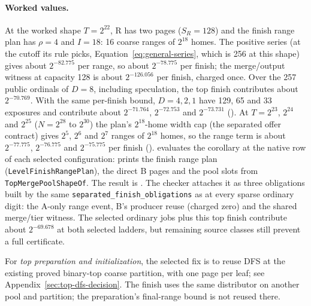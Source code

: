 \documentclass[11pt]{article}
\theoremstyle{definition}
\theoremstyle{remark}
\begin{document}
\paragraph{Worked values.}
At the worked shape $T=2^{22}$, R has two pages ($S_R=128$) and the finish
range plan has $\rho=4$ and $I=18$: 16 coarse ranges of $2^{18}$ homes.
The positive series (at the cutoff its rule picks,
Equation~\eqref{eq:general-series}, which is 256 at this shape) gives about
$2^{-82.775}$ per range, so about $2^{-78.775}$ per finish; the merge/output witness at capacity 128 is
about $2^{-126.056}$ per finish, charged once. Over the 257 public ordinals
of $D=8$, including speculation, the top finish contributes about
$2^{-70.769}$. With the same per-finish bound, $D=4,2,1$ have 129, 65 and
33 exposures and contribute about $2^{-71.764}$, $2^{-72.753}$ and
$2^{-73.731}$ ().
At $T=2^{23}$, $2^{24}$ and $2^{25}$ ($N=2^{28}$ to $2^{30}$) the plan's
$2^{18}$-home width cap (the separated offer contract) gives $2^5$,
$2^6$ and $2^7$ ranges of $2^{18}$ homes, so the range term is about
$2^{-77.775}$, $2^{-76.775}$ and $2^{-75.775}$ per finish
().
 evaluates the corollary at the native
row of each selected configuration: 
prints the finish range plan (\texttt{LevelFinishRangePlan}), the direct B
pages and the pool slots from \texttt{TopMergePoolShapeOf}. The result is
. The checker attaches it as three
obligations built by the same \texttt{separated\_finish\_obligations} as at
every sparse ordinary digit: the A-only range event, B's producer reuse
(charged zero) and the shared merge/tier witness. The selected ordinary
jobs plus this top finish contribute about $2^{-69.678}$ at both selected
ladders, but remaining source classes still prevent a full certificate.

 For \emph{top preparation and initialization}, the selected fix
is to reuse DFS at the existing proved binary-top coarse partition, with
one page per leaf; see Appendix~\ref{sec:top-dfs-decision}.
The finish uses the same distributor on another pool and partition; the
preparation's final-range bound is not reused there.
\end{document}
